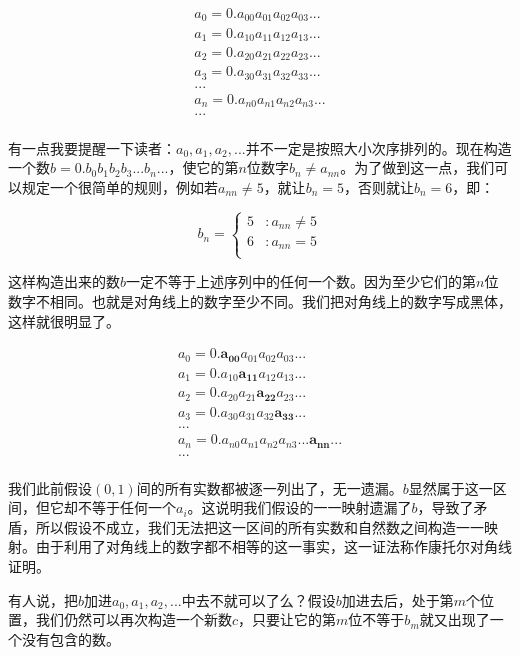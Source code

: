 \documentclass{article}
\begin{document}
\[
\begin{array}{l}
a_0 = 0.a_{00}a_{01}a_{02}a_{03}...\\
a_1 = 0.a_{10}a_{11}a_{12}a_{13}...\\
a_2 = 0.a_{20}a_{21}a_{22}a_{23}...\\
a_3 = 0.a_{30}a_{31}a_{32}a_{33}...\\
... \\
a_n = 0.a_{n0}a_{n1}a_{n2}a_{n3}...\\
... \\
\end{array}
\]

有一点我要提醒一下读者：$a_0, a_1, a_2, ...$并不一定是按照大小次序排列的。现在构造一个数$b = 0.b_0b_1b_2b_3...b_n...$，使它的第$n$位数字$b_n \neq a_{nn}$。为了做到这一点，我们可以规定一个很简单的规则，例如若$a_{nn} \neq 5$，就让$b_n = 5$，否则就让$b_n = 6$，即：

\[
b_n = \begin{cases}
5 & : a_{nn} \neq 5 \\
6 & : a_{nn} = 5 \\
\end{cases}
\]

这样构造出来的数$b$一定不等于上述序列中的任何一个数。因为至少它们的第$n$位数字不相同。也就是对角线上的数字至少不同。我们把对角线上的数字写成黑体，这样就很明显了。

\[
\begin{array}{l}
a_0 = 0.\pmb{a_{00}}a_{01}a_{02}a_{03}...\\
a_1 = 0.a_{10}\pmb{a_{11}}a_{12}a_{13}...\\
a_2 = 0.a_{20}a_{21}\pmb{a_{22}}a_{23}...\\
a_3 = 0.a_{30}a_{31}a_{32}\pmb{a_{33}}...\\
... \\
a_n = 0.a_{n0}a_{n1}a_{n2}a_{n3}...\pmb{a_{nn}}...\\
... \\
\end{array}
\]

我们此前假设$(0, 1)$间的所有实数都被逐一列出了，无一遗漏。$b$显然属于这一区间，但它却不等于任何一个$a_i$。这说明我们假设的一一映射遗漏了$b$，导致了矛盾，所以假设不成立，我们无法把这一区间的所有实数和自然数之间构造一一映射。由于利用了对角线上的数字都不相等的这一事实，这一证法称作康托尔对角线证明。

有人说，把$b$加进$a_0, a_1, a_2, ...$中去不就可以了么？假设$b$加进去后，处于第$m$个位置，我们仍然可以再次构造一个新数$c$，只要让它的第$m$位不等于$b_m$就又出现了一个没有包含的数。
\end{document}
